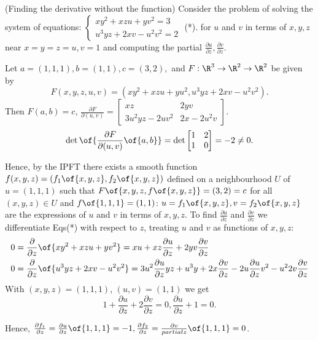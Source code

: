\begin{example}(Finding the derivative without the function)
    Consider the problem of solving the system of equations: $\left\{ \begin{matrix} xy^2 + xzu + yv^2 = 3 \\ u^3yz + 2xv - u^2v^2 = 2 \end{matrix} \right.$ (*).
    for $u$ and $v$ in terms of $x, y, z$ near $x = y = z = u, v= 1$ and computing the partial $\frac{\partial u}{\partial z}, \frac{\partial v}{\partial z}$.

    Let $a = (1,1,1), b = (1,1), c = (3,2),$ and $F: \R^3 \to \R^2 \to \R^2$ be given by 
    \[F(x,y,z,u,v) = (xy^2 + xzu + yu^2, u^3yz + 2xv - u^2v^2).\]
    Then $F(a,b) = c$, $\frac{\partial F}{\partial(u,v)} = \begin{bmatrix}
        xz & 2yv \\ 3u^2yz - 2uv^2 & 2x - 2u^2v
    \end{bmatrix}$.
    \[\det\of{\frac{\partial F}{\partial (u,v)}\of{a,b}} =\det \begin{bmatrix} 1 & 2 \\ 1 & 0 \end{bmatrix} = -2 \neq 0.\]

    Hence, by the IPFT there exists a smooth function $f(x,y,z) = (f_1\of{x,y,z}, f_2\of{x,y,z})$ defined on a neighbourhood $U$ of $u = (1,1,1)$ such that $F\of{x,y,z, f\of{x,y,z}} = (3,2) = c$ for all $(x,y,z) \in U$ and $f\of{1,1,1} = (1,1)$: $u = f_1\of{x,y,z}, v = f_2\of{x,y,z}$ are the expressions of $u$ and $v$ in terms of $x,y,z$. To find $\frac{\partial u}{\partial z}$ and $\frac{\partial v}{\partial z}$ we differentiate Eqs(*) with respect to $z$, treating $u$ and $v$ as functions of $x,y,z$:
    \begin{align*}
        0 &= \frac{\partial}{\partial z}\of{xy^2 + xzu + yv^2} = xu + xz \frac{\partial u}{\partial z} + 2yv \frac{\partial v}{\partial z} \\
        0 &= \frac{\partial}{\partial z}\of{u^3yz + 2xv - u^2v^2} = 3u^2 \frac{\partial u}{\partial z} yz + u^3y + 2x \frac{\partial v}{\partial z} - 2u \frac{\partial u}{\partial z}v^2 - u^2 2v \frac{\partial v}{\partial z}
    \end{align*}
    With $(x,y,z) = (1,1,1)$, $(u,v) = (1,1)$ we get
    \[1 + \frac{\partial u}{\partial z} + 2 \frac{\partial v}{\partial z} = 0, \frac{\partial u}{\partial z} + 1 = 0.\]

    Hence, $\frac{\partial f_1}{\partial z} = \frac{\partial u}{\partial z}\of{1,1,1} = -1, \frac{\partial f_2}{\partial z} = \frac{\partial v}{partial z}\of{1,1,1} = 0$.
\end{example}


